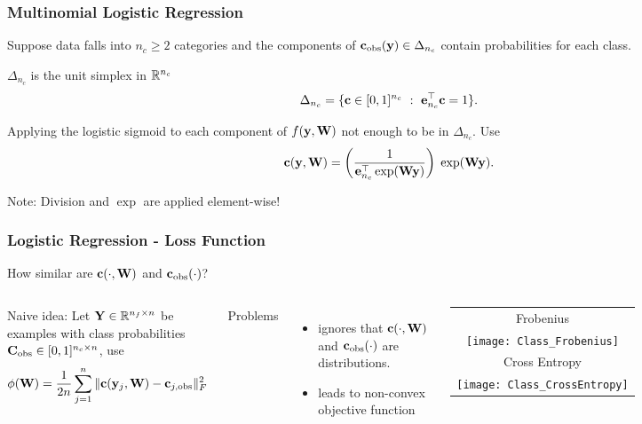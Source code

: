 \documentclass[12pt,fleqn,handout]{beamer}
\begin{document}
\begin{frame}
	\frametitle{Multinomial Logistic Regression}
	
	Suppose data falls into $n_c\geq 2$ categories and the components of ${\bf c}_{\rm obs}({\bf y}) \in \Delta_{n_c}$ contain probabilities for each class. 
	
	\bigskip
	
	$\Delta_{n_c}$ is the unit simplex in $\mathbb{R}^{n_c}$
	\begin{equation*}
		\Delta_{n_c} = \{ \bfc \in [0,1]^{n_c} \ : \ \bfe_{n_c}^\top \bfc = 1\}.
	\end{equation*}
	
	\bigskip
	 
	Applying the logistic sigmoid to each component of $f({\bf y},{\bf W})$ not enough to be in $\Delta_{n_c}$. Use
	$$
		{\bf c}({\bf y},{\bf W}) = \left( \frac{1}{{\bf e}_{n_c}^\top\exp({\bf W}{\bf y})} \right) \; \exp({\bf W}{\bf y}).
	$$
	
	\bigskip
	
	Note: Division and $\exp$ are applied element-wise!
	
\end{frame}
\begin{frame}
	\frametitle{Logistic Regression - Loss Function}
	
	How similar are ${\bf c}(\cdot,{\bf W})$ and ${\bf c}_{\rm obs}(\cdot)$?

	\begin{columns}
	Naive idea: Let ${\bf Y} \in \mathbb{R}^{n_f\times n}$ be examples with class probabilities ${\bf C}_{\rm obs} \in [0,1]^{n_c\times n}$, use 
	$$
	\phi({\bf W})= \frac{1}{2n} \sum_{j=1}^n\|{\bf c}({\bf y}_j,{\bf W}) - {\bf c}_{j,{\rm obs}} \|_F^2
	$$

Problems
\begin{itemize}
	\item ignores that ${\bf c}(\cdot,{\bf W})$ and ${\bf c}_{\rm obs}(\cdot)$ are distributions.
	\item leads to non-convex objective function
\end{itemize} 
		
		
		\begin{tabular}{c}
			Frobenius\\
			\texttt{[image: Class\_Frobenius]}\\
			Cross Entropy\\
			\texttt{[image: Class\_CrossEntropy]}
		\end{tabular}
	\end{columns}
	
\end{frame}
\end{document}
